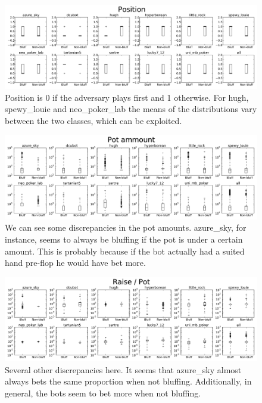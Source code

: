 \documentclass[letterpaper]{article}
\begin{document}
\onecolumn
\begin{figure}[H]
    \centering
    \includegraphics[width=\textwidth,natwidth=610,natheight=642]{posBW.jpg}
    \caption{Position is 0 if the adversary plays first and 1 otherwise. For hugh, spewy\_louie  and neo\_poker\_lab the means of the distributions vary between the two classes, which can be exploited. }
    \label{fig:pos}
\end{figure}
\begin{figure}[H]
    \centering
    \includegraphics[width=\textwidth,natwidth=610,natheight=642]{potVarBW.jpg}
    \caption{We can see some discrepancies in the pot amounts. azure\_sky, for instance, seems to always be bluffing if the pot is under a certain amount. This is probably because if the bot actually had a suited hand pre-flop he would have bet more.}
\end{figure}
\begin{figure}[H]
    \centering
    \includegraphics[width=\textwidth,natwidth=610,natheight=642]{raisePotVarBW.jpg}
    \caption{Several other discrepancies here. It seems that azure\_sky almost always bets the same proportion when not bluffing. Additionally, in general, the bots seem to bet more when not bluffing.}
\end{figure}
\end{document}
